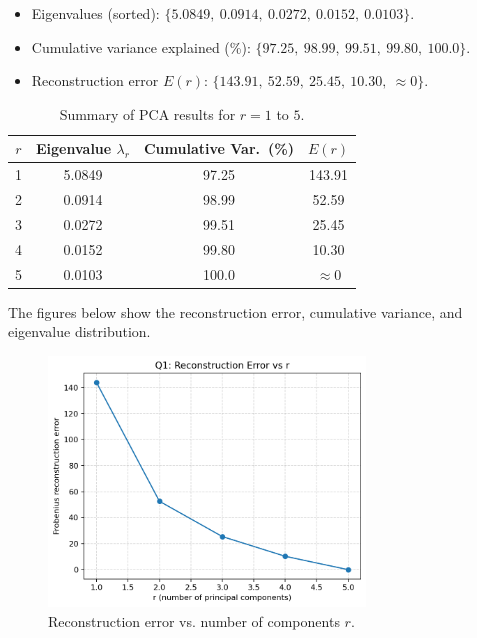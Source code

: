 \documentclass[12pt,a4paper]{article}
\begin{document}
\begin{itemize}
    \item Eigenvalues (sorted): $\{5.0849,\ 0.0914,\ 0.0272,\ 0.0152,\ 0.0103\}$.
    \item Cumulative variance explained (\%): $\{97.25,\ 98.99,\ 99.51,\ 99.80,\ 100.0\}$.
    \item Reconstruction error $E(r)$: $\{143.91,\ 52.59,\ 25.45,\ 10.30,\ \approx 0\}$.
\end{itemize}

\begin{table}[H]
\centering
\caption{Summary of PCA results for $r = 1$ to $5$.}
\begin{tabular}{@{}cccc@{}}
\toprule
$r$ & Eigenvalue $\lambda_r$ & Cumulative Var.\ (\%) & $E(r)$ \\
\midrule
1 & 5.0849 & 97.25 & 143.91 \\
2 & 0.0914 & 98.99 & 52.59 \\
3 & 0.0272 & 99.51 & 25.45 \\
4 & 0.0152 & 99.80 & 10.30 \\
5 & 0.0103 & 100.0 & $\approx 0$ \\
\bottomrule
\end{tabular}
\end{table}

The figures below show the reconstruction error, cumulative variance, and eigenvalue distribution.

\begin{figure}[H]
    \centering
    \includegraphics[width=0.75\textwidth]{outputs/q1/q1_error_vs_r.png}
    \caption{Reconstruction error vs. number of components $r$.}
\end{figure}
\end{document}
